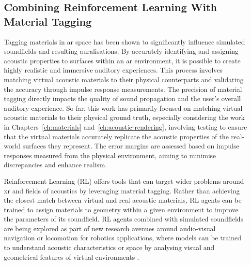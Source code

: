 


\subsection{Combining Reinforcement Learning With Material Tagging}
Tagging materials in \acrshort{ar} space has been shown to significantly influence simulated soundfields and resulting auralisations. By accurately identifying and assigning acoustic properties to surfaces within an \acrshort{ar} environment, it is possible to create highly realistic and immersive auditory experiences. This process involves matching virtual acoustic materials to their physical counterparts and validating the accuracy through impulse response measurements. The precision of material tagging directly impacts the quality of sound propagation and the user's overall auditory experience.
So far, this work has primarily focused on matching virtual acoustic materials to their physical ground truth, especially considering the work in Chapters~\ref{ch:materials} and~\ref{ch:acoustic-rendering}, involving testing to ensure that the virtual materials accurately replicate the acoustic properties of the real-world surfaces they represent. The error margins are assessed based on impulse responses measured from the physical environment, aiming to minimise discrepancies and enhance realism.\par
Reinforcement Learning (RL) offers tools that can target wider problems around \acrshort{xr} and fields of acoustics by leveraging material tagging. Rather than achieving the closest match between virtual and real acoustic materials, RL agents can be trained to assign materials to geometry within a given environment to improve the parameters of its soundfield. RL agents combined with simulated soundfields are being explored as part of new research avenues around audio-visual navigation or locomotion for robotics applications, where models can be trained to understand acoustic characteristics or space by analysing visual and geometrical features of virtual environments \citep{chen2021semantic, gan2020look}.
